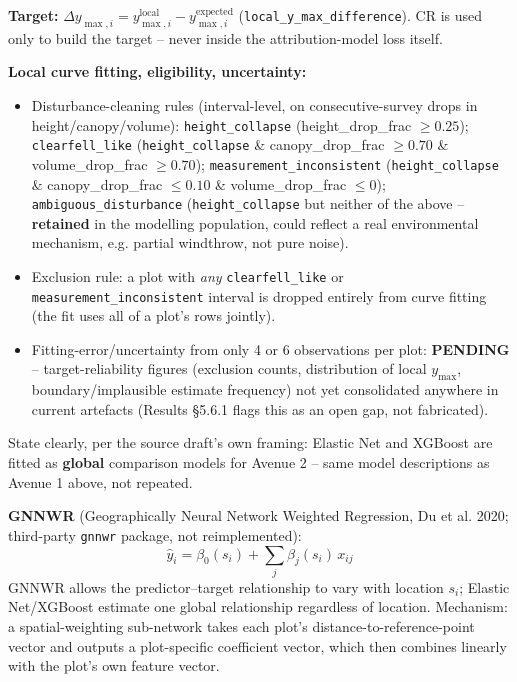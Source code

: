 \documentclass[11pt,a4paper]{report}
\begin{document}
\textbf{Target:} $\Delta y_{\max,i} = y_{\max,i}^{\text{local}} - y_{\max,i}^{\text{expected}}$
(\texttt{local\_y\_max\_difference}). CR is used only to build the target -- never inside the
attribution-model loss itself.

\textbf{Local curve fitting, eligibility, uncertainty:}
\begin{itemize}
\setlength\itemsep{0pt}
\item Disturbance-cleaning rules (interval-level, on consecutive-survey drops in
height/canopy/volume): \texttt{height\_collapse} (height\_drop\_frac $\ge 0.25$);
\texttt{clearfell\_like} (\texttt{height\_collapse} \& canopy\_drop\_frac $\ge 0.70$ \&
volume\_drop\_frac $\ge 0.70$); \texttt{measurement\_inconsistent} (\texttt{height\_collapse} \&
canopy\_drop\_frac $\le 0.10$ \& volume\_drop\_frac $\le 0$); \texttt{ambiguous\_disturbance}
(\texttt{height\_collapse} but neither of the above -- \textbf{retained} in the modelling
population, could reflect a real environmental mechanism, e.g. partial windthrow, not pure noise).
\item Exclusion rule: a plot with \emph{any} \texttt{clearfell\_like} or
\texttt{measurement\_inconsistent} interval is dropped entirely from curve fitting (the fit uses
all of a plot's rows jointly).
\item Fitting-error/uncertainty from only 4 or 6 observations per plot: \textbf{PENDING} --
target-reliability figures (exclusion counts, distribution of local $y_{\max}$, boundary/implausible
estimate frequency) not yet consolidated anywhere in current artefacts (Results \S5.6.1 flags this
as an open gap, not fabricated).
\end{itemize}

State clearly, per the source draft's own framing: Elastic Net and XGBoost are fitted as
\textbf{global} comparison models for Avenue 2 -- same model descriptions as Avenue 1 above, not
repeated.

\textbf{GNNWR} (Geographically Neural Network Weighted Regression, Du et al. 2020; third-party
\texttt{gnnwr} package, not reimplemented):
\[
\hat y_i = \beta_0(s_i) + \sum_j \beta_j(s_i)\, x_{ij}
\]
GNNWR allows the predictor--target relationship to vary with location $s_i$; Elastic Net/XGBoost
estimate one global relationship regardless of location. Mechanism: a spatial-weighting sub-network
takes each plot's distance-to-reference-point vector and outputs a plot-specific coefficient vector,
which then combines linearly with the plot's own feature vector.
\end{document}
